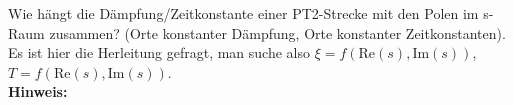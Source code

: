 \begin{question}[section=3,name={PT2-Glied},difficulty=5,type=mdl,tags={}]
	Wie hängt die Dämpfung/Zeitkonstante einer PT2-Strecke mit den Polen im s-Raum zusammen? (Orte konstanter Dämpfung, Orte konstanter Zeitkonstanten). Es ist hier die Herleitung gefragt, man suche also $\xi=f(\textrm{Re}(s),\textrm{Im}(s))$, $T=f(\textrm{Re}(s),\textrm{Im}(s))$.
	\\ \textbf{Hinweis:}\\
	
\end{question}
\begin{solution}
	
\end{solution}